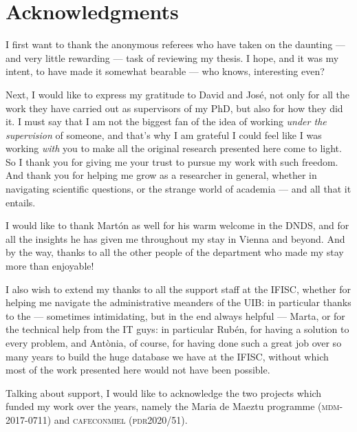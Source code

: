 \documentclass[../thesis.tex]{subfiles}
\begin{document}

\begingroup
\let\clearpage\relax
\let\cleardoublepage\relax
\let\cleardoublepage\relax
\chapter*{Acknowledgments}

I first want to thank the anonymous referees who have taken on the daunting --- and very little rewarding --- task of reviewing my thesis.
I hope, and it was my intent, to have made it somewhat bearable --- who knows, interesting even?

Next, I would like to express my gratitude to David and José, not only for all the work they have carried out as supervisors of my PhD, but also for how they did it.
I must say that I am not the biggest fan of the idea of working \emph{under the supervision} of someone, and that's why I am grateful I could feel like I was working \emph{with} you to make all the original research presented here come to light.
So I thank you for giving me your trust to pursue my work with such freedom.
And thank you for helping me grow as a researcher in general, whether in navigating scientific questions, or the strange world of academia --- and all that it entails.

I would like to thank Martón as well for his warm welcome in the DNDS, and for all the insights he has given me throughout my stay in Vienna and beyond.
And by the way, thanks to all the other people of the department who made my stay more than enjoyable!

I also wish to extend my thanks to all the support staff at the IFISC, whether for helping me navigate the administrative meanders of the UIB: in particular thanks to the --- sometimes intimidating, but in the end always helpful --- Marta, or for the technical help from the IT guys: in particular Rubén, for having a solution to every problem, and Antònia, of course, for having done such a great job over so many years to build the huge database we have at the IFISC, without which most of the work presented here would not have been possible.

Talking about support, I would like to acknowledge the two projects which funded my work over the years, namely the Maria de Maeztu programme (\textsc{mdm}-2017-0711) and \textsc{cafeconmiel} (\textsc{pdr}2020/51).
\end{document}
